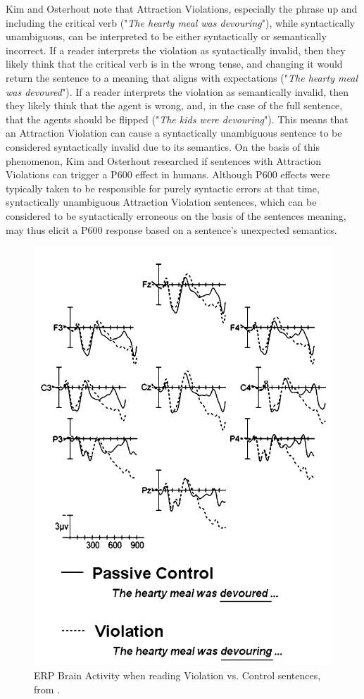 \documentclass{IEEEtran}
\begin{document}
Kim and Osterhout note that Attraction Violations, especially the phrase up and including the critical verb ("\textit{The hearty meal was devouring}"), while syntactically unambiguous, can be interpreted to be either syntactically or semantically incorrect.
If a reader interprets the violation as syntactically invalid, then they likely think that the critical verb is in the wrong tense, and changing it would return the sentence to a meaning that aligns with expectations ("\textit{The hearty meal was devoured}").
If a reader interprets the violation as semantically invalid, then they likely think that the agent is wrong, and, in the case of the full sentence, that the agents should be flipped ("\textit{The kids were devouring}").
This means that an Attraction Violation can cause a syntactically unambiguous sentence to be considered syntactically invalid due to its semantics.
On the basis of this phenomenon, Kim and Osterhout researched if sentences with Attraction Violations can trigger a P600 effect in humans.
Although P600 effects were typically taken to be responsible for purely syntactic errors at that time, syntactically unambiguous Attraction Violation sentences, which can be considered to be syntactically erroneous on the basis of the sentences meaning, may thus elicit a P600 response based on a sentence's unexpected semantics.

\begin{figure}
    \centering
    \includegraphics[width=.45\textwidth]{kim_osterhout.png}
    \caption{ERP Brain Activity when reading Violation vs. Control sentences, from \cite{kim2005combinatory}.}
    \label{fig:kim_osterhout}
\end{figure}
\end{document}
